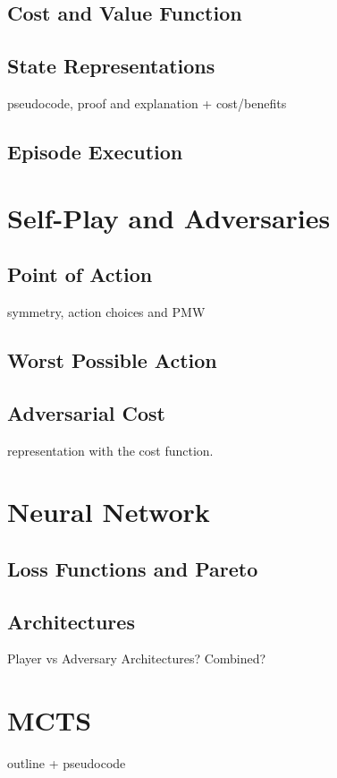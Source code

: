 \documentclass[main.tex]{subfiles}
\begin{document}
\subsection{Cost and Value Function}


\subsection{State Representations}
pseudocode, proof and explanation + cost/benefits

\subsection{Episode Execution}

\section{Self-Play and Adversaries}

\subsection{Point of Action}
symmetry, action choices and PMW

\subsection{Worst Possible Action}

\subsection{Adversarial Cost}
representation with the cost function.

\section{Neural Network}
\subsection{Loss Functions and Pareto}

\subsection{Architectures}
Player vs Adversary Architectures? Combined?

\section{MCTS}
outline + pseudocode
\end{document}
